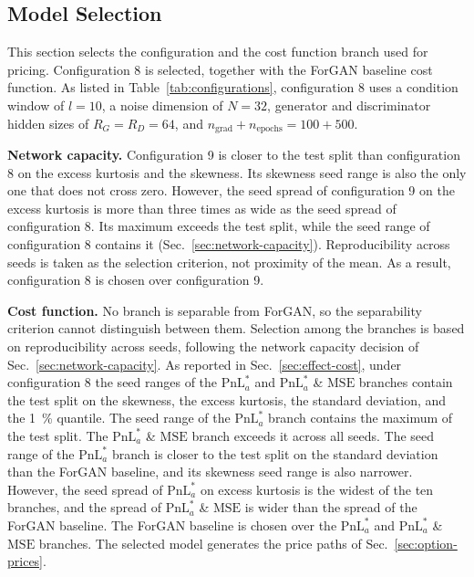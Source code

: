 \subsection{Model Selection}\label{sec:model-selection}

This section selects the configuration and the cost function branch used for pricing. Configuration 8 is selected, together with the ForGAN baseline cost function. As listed in Table~\ref{tab:configurations}, configuration 8 uses a condition window of $l=\num{10}$, a noise dimension of $N=\num{32}$, generator and discriminator hidden sizes of $R_G=R_D=\num{64}$, and $n_{\mathrm{grad}} + n_{\mathrm{epochs}} = \num{100} + \num{500}$.

\textbf{Network capacity.} Configuration 9 is closer to the test split than configuration 8 on the excess kurtosis and the skewness. Its skewness seed range is also the only one that does not cross zero. However, the seed spread of configuration 9 on the excess kurtosis is more than three times as wide as the seed spread of configuration 8. Its maximum exceeds the test split, while the seed range of configuration 8 contains it (Sec.~\ref{sec:network-capacity}). Reproducibility across seeds is taken as the selection criterion, not proximity of the mean. As a result, configuration 8 is chosen over configuration 9.

\textbf{Cost function.} No branch is separable from ForGAN, so the separability criterion cannot distinguish between them. Selection among the branches is based on reproducibility across seeds, following the network capacity decision of Sec.~\ref{sec:network-capacity}. As reported in Sec.~\ref{sec:effect-cost}, under configuration 8 the seed ranges of the $\mathrm{PnL}^{*}_{a}$ and $\mathrm{PnL}^{*}_{a}$ \& $\mathrm{MSE}$ branches contain the test split on the skewness, the excess kurtosis, the standard deviation, and the \SI{1}{\percent} quantile. The seed range of the $\mathrm{PnL}^{*}_{a}$ branch contains the maximum of the test split. The $\mathrm{PnL}^{*}_{a}$ \& $\mathrm{MSE}$ branch exceeds it across all seeds. The seed range of the $\mathrm{PnL}^{*}_{a}$ branch is closer to the test split on the standard deviation than the ForGAN baseline, and its skewness seed range is also narrower. However, the seed spread of $\mathrm{PnL}^{*}_{a}$ on excess kurtosis is the widest of the ten branches, and the spread of $\mathrm{PnL}^{*}_{a}$ \& $\mathrm{MSE}$ is wider than the spread of the ForGAN baseline. The ForGAN baseline is chosen over the $\mathrm{PnL}^{*}_{a}$ and $\mathrm{PnL}^{*}_{a}$ \& $\mathrm{MSE}$ branches. The selected model generates the price paths of Sec.~\ref{sec:option-prices}.